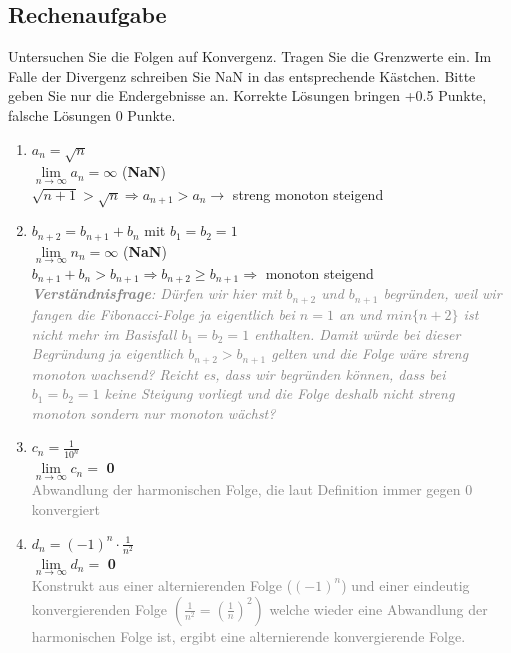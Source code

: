 \documentclass[a4paper]{article}
\begin{document}
\subsection{Rechenaufgabe}
Untersuchen Sie die Folgen auf Konvergenz. Tragen Sie die Grenzwerte ein. Im Falle der Divergenz schreiben Sie NaN in das entsprechende Kästchen. Bitte geben Sie nur die Endergebnisse an. Korrekte Lösungen bringen +0.5 Punkte, falsche Lösungen 0 Punkte.
\bigskip
\begin{enumerate}
    \item $a_n=\sqrt{n}$\\
    $\lim\limits_{n\to\infty}a_n= \infty$ (\textbf{NaN})\\
    $\sqrt{n+1}>\sqrt{n} \Rightarrow a_{n+1}>a_n \rightarrow$ streng monoton steigend 
    \bigskip
    \item $b_{n+2}=b_{n+1}+b_n$ mit $b_1=b_2=1$\\
    $\lim\limits_{n\to\infty}n_n=\infty$ (\textbf{NaN})\\
    $b_{n+1}+b_n > b_{n+1} \Rightarrow b_{n+2}\geq b_{n+1} \Rightarrow $ monoton steigend\\
    \textcolor{gray}{\textit{\textbf{Verständnisfrage}: Dürfen wir hier mit $b_{n+2}$ und $b_{n+1}$ begründen, weil wir fangen die Fibonacci-Folge ja eigentlich bei $n=1$ an und $min\{n+2\}$ ist nicht mehr im Basisfall $b_1=b_2=1$ enthalten. Damit würde bei dieser Begründung ja eigentlich $b_{n+2}>b_{n+1}$ gelten und die Folge wäre streng monoton wachsend? Reicht es, dass wir begründen können, dass bei $b_1=b_2=1$ keine Steigung vorliegt und die Folge deshalb nicht streng monoton sondern nur monoton wächst?}}
    \bigskip
    \item $c_n=\frac{1}{10^n}$\\
    $\lim\limits_{n\to\infty}c_n=$ \textbf{0}\\
    \textcolor{gray}{Abwandlung der harmonischen Folge, die laut Definition immer gegen 0 konvergiert}
    \bigskip
    \item $d_n=(-1)^n\cdot \frac{1}{n^2}$\\
    $\lim\limits_{n\to\infty}d_n=$ \textbf{0}\\
    \textcolor{gray}{Konstrukt aus einer alternierenden Folge ($(-1)^n$) und einer eindeutig konvergierenden Folge $\left(\frac{1}{n^2} = \left( \frac{1}{n} \right)^2\right)$ welche wieder eine Abwandlung der harmonischen Folge ist, ergibt eine alternierende konvergierende Folge.}
\end{enumerate}
\end{document}
